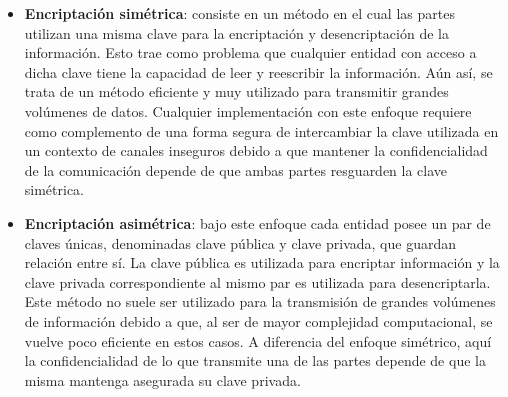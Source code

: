\begin{itemize}
    \item \textbf{Encriptación simétrica}: consiste en un método en el cual las partes utilizan una misma clave para la encriptación y desencriptación de la información. Esto trae como problema que cualquier entidad con acceso a dicha clave tiene la capacidad de leer y reescribir la información. Aún así, se trata de un método eficiente y muy utilizado para transmitir grandes volúmenes de datos. Cualquier implementación con este enfoque requiere como complemento de una forma segura de intercambiar la clave utilizada en un contexto de canales inseguros debido a que mantener la confidencialidad de la comunicación depende de que ambas partes resguarden la clave simétrica.
    
    \item \textbf{Encriptación asimétrica}: bajo este enfoque cada entidad posee un par de claves únicas, denominadas clave pública y clave privada, que guardan relación entre sí. La clave pública es utilizada para encriptar información y la clave privada correspondiente al mismo par es utilizada para desencriptarla. Este método no suele ser utilizado para la transmisión de grandes volúmenes de información debido a que, al ser de mayor complejidad computacional, se vuelve poco eficiente en estos casos. A diferencia del enfoque simétrico, aquí la confidencialidad de lo que transmite una de las partes depende de que la misma mantenga asegurada su clave privada.
\end{itemize}

